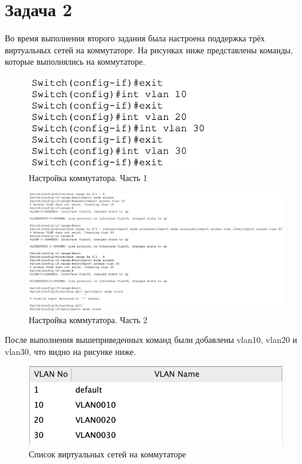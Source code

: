 \section{Задача 2}%
\label{sec:2}

Во время выполнения второго задания была настроена поддержка трёх виртуальных сетей на коммутаторе. На рисунках ниже представлены команды, которые выполнялись на коммутаторе.

\begin{figure}[H]
    \centering
    \includegraphics[width=0.7\textwidth]{images/img-1.png}
    \caption{Настройка коммутатора. Часть 1}
    \label{fig:router7}
\end{figure}

\begin{figure}[H]
    \centering
    \includegraphics[width=1.04\textwidth]{images/img-2.png}
    \caption{Настройка коммутатора. Часть 2}
    \label{fig:router7}
\end{figure}

После выполнения вышеприведенных команд были добавлены vlan10, vlan20 и vlan30, что видно на рисунке ниже.

\begin{figure}[H]
    \centering
    \includegraphics[width=1\textwidth]{images/vlan.png}
    \caption{Список виртуальных сетей на коммутаторе}
    \label{fig:router7}
\end{figure}

